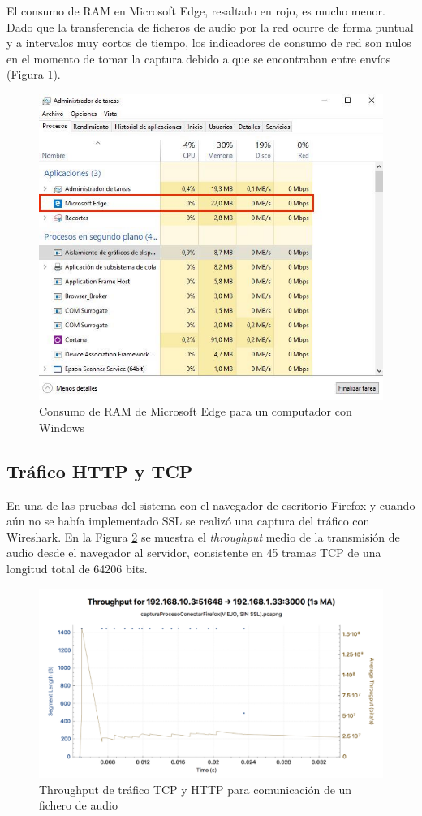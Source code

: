 El consumo de RAM en Microsoft Edge, resaltado en rojo, es mucho menor. Dado que la transferencia de ficheros de audio por la red ocurre de forma puntual y a intervalos muy cortos de tiempo, los indicadores de consumo de red son nulos en el momento de tomar la captura debido a que se encontraban entre envíos (Figura \ref{edgeRAM}).

\begin{figure}[!t]
\begin{center}
\includegraphics[width=0.75\linewidth]{./6_EvalEmpirica/Img/edgeRAM.jpg}
\end{center}
\caption{Consumo de RAM de Microsoft Edge para un computador con Windows}
\label{edgeRAM}
\end{figure}

\subsection{Tráfico HTTP y TCP}

En una de las pruebas del sistema con el navegador de escritorio Firefox y cuando aún no se había implementado SSL se realizó una captura del tráfico con Wireshark. En la Figura \ref{traffic} se muestra el \emph{throughput} medio de la transmisión de audio desde el navegador al servidor, consistente en 45 tramas TCP de una longitud total de 64206 bits.

\begin{figure}[!t]
\begin{center}
\includegraphics[width=0.75\linewidth]{./6_EvalEmpirica/Img/traffic.png}
\end{center}
\caption{Throughput de tráfico TCP y HTTP para comunicación de un fichero de audio}
\label{traffic}
\end{figure}

